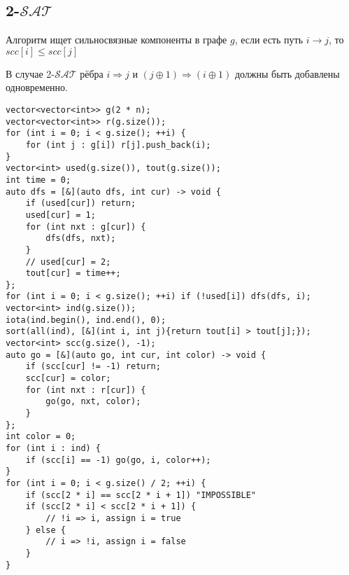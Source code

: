 \subsection{2-$\mathcal{SAT}$}
Алгоритм ищет сильносвязные компоненты в графе $g$, если есть путь $i \rightarrow j$, то $scc[i] \le scc[j]$

В случае 2-$\mathcal{SAT}$ рёбра $i \Rightarrow j$ и $(j\oplus1) \Rightarrow (i \oplus 1)$ должны быть добавлены одновременно.
\begin{lstlisting}
vector<vector<int>> g(2 * n);
vector<vector<int>> r(g.size());
for (int i = 0; i < g.size(); ++i) {
    for (int j : g[i]) r[j].push_back(i);
}
vector<int> used(g.size()), tout(g.size());
int time = 0;
auto dfs = [&](auto dfs, int cur) -> void {
    if (used[cur]) return;
    used[cur] = 1;
    for (int nxt : g[cur]) {
        dfs(dfs, nxt);
    }
    // used[cur] = 2;
    tout[cur] = time++;
};
for (int i = 0; i < g.size(); ++i) if (!used[i]) dfs(dfs, i);
vector<int> ind(g.size());
iota(ind.begin(), ind.end(), 0);
sort(all(ind), [&](int i, int j){return tout[i] > tout[j];});
vector<int> scc(g.size(), -1);
auto go = [&](auto go, int cur, int color) -> void {
    if (scc[cur] != -1) return;
    scc[cur] = color;
    for (int nxt : r[cur]) {
        go(go, nxt, color);
    }
};
int color = 0;
for (int i : ind) {
    if (scc[i] == -1) go(go, i, color++);
}
for (int i = 0; i < g.size() / 2; ++i) {
    if (scc[2 * i] == scc[2 * i + 1]) "IMPOSSIBLE"
    if (scc[2 * i] < scc[2 * i + 1]) {
        // !i => i, assign i = true
    } else {
        // i => !i, assign i = false
    }
}
\end{lstlisting}

